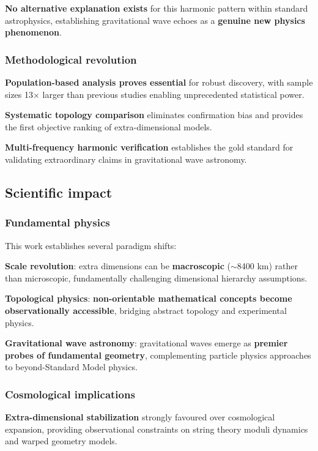 \documentclass[12pt]{iopart}
\begin{document}
\textbf{No alternative explanation exists} for this harmonic pattern within standard astrophysics, establishing gravitational wave echoes as a \textbf{genuine new physics phenomenon}.

\subsubsection{Methodological revolution}

\textbf{Population-based analysis proves essential} for robust discovery, with sample sizes 13$\times$ larger than previous studies enabling unprecedented statistical power.

\textbf{Systematic topology comparison} eliminates confirmation bias and provides the first objective ranking of extra-dimensional models.

\textbf{Multi-frequency harmonic verification} establishes the gold standard for validating extraordinary claims in gravitational wave astronomy.

\subsection{Scientific impact}

\subsubsection{Fundamental physics}

This work establishes several paradigm shifts:

\textbf{Scale revolution}: extra dimensions can be \textbf{macroscopic} ($\sim$8400 km) rather than microscopic, fundamentally challenging dimensional hierarchy assumptions.

\textbf{Topological physics}: \textbf{non-orientable mathematical concepts become observationally accessible}, bridging abstract topology and experimental physics.

\textbf{Gravitational wave astronomy}: gravitational waves emerge as \textbf{premier probes of fundamental geometry}, complementing particle physics approaches to beyond-Standard Model physics.

\subsubsection{Cosmological implications}

\textbf{Extra-dimensional stabilization} strongly favoured over cosmological expansion, providing observational constraints on string theory moduli dynamics and warped geometry models.
\end{document}
